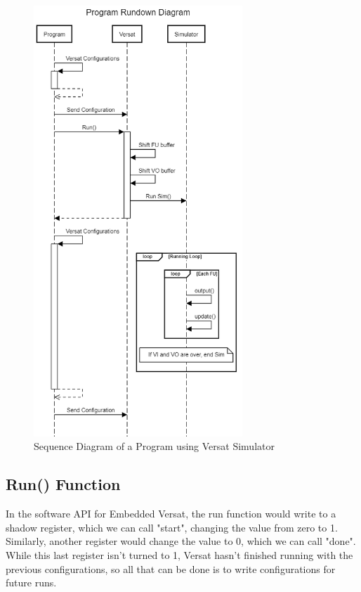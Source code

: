 \newpage
\begin{figure}[!htbp]
    \centering
    \includegraphics[width=0.7\textwidth]{Figures/versatsim.png}
    \caption{Sequence Diagram of a Program using Versat Simulator}
    \label{figure:VersatSimulatorSequenceDiagram}
\end{figure} 



\subsection{Run() Function}

In the software API for Embedded Versat, the run function would write to a shadow register,
which we can call "start", changing the value from zero to 1. 
Similarly, another register would
change the value to 0, which we can call "done". While this last register isn't turned to 1, 
Versat hasn't finished running with the 
previous configurations, so all that can be done is to write
configurations for future runs.

